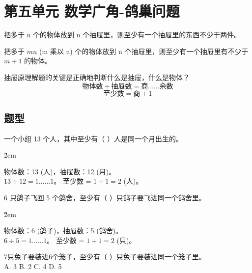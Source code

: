 \section*{第五单元 数学广角-鸽巢问题}
\begin{theorem}[抽屉原理（一）]
    把多于 n 个的物体放到 n 个抽屉里，则至少有一个抽屉里的东西不少于两件。
\end{theorem}

\begin{theorem}[抽屉原理（二）]
    把多于 $mn$ (m 乘以 n) 个的物体放到 n 个抽屉里，则至少有一个抽屉里有不少于 $m+1$ 的物体。
\end{theorem}

\begin{tips}
    抽屉原理解题的关键是正确地判断什么是抽屉，什么是物体？
    $$ \text{物体数} \div \text{抽屉数} = \text{商} \dots\dots \text{余数} $$
    $$ \text{至少数} = \text{商} + 1 $$
\end{tips}

\subsection*{题型}
\begin{example}
    一个小组 13 个人，其中至少有（ \quad ）人是同一个月出生的。
\end{example}

\v{2em}

\begin{solution}
    物体数：13 (人)，抽屉数：12 (月)。\\
    $13 \div 12 = 1 \dots\dots 1$。
    至少数 = $1+1=2$ (人)。
\end{solution}

\begin{example}
    6 只鸽子飞回 5 个鸽舍，至少有（ \quad ）只鸽子要飞进同一个鸽舍里。
\end{example}

\v{2em}

\begin{solution}
    物体数：6 (鸽子)，抽屉数：5 (鸽舍)。\\
    $6 \div 5 = 1 \dots\dots 1$。
    至少数 = $1+1=2$ (只)。
\end{solution}

\begin{example}
    7只兔子要装进6个笼子，至少有（ \quad ）只兔子要装进同一个笼子里。\\
    A. 3 \qquad B. 2 \qquad C. 4 \qquad D. 5
\end{example}

